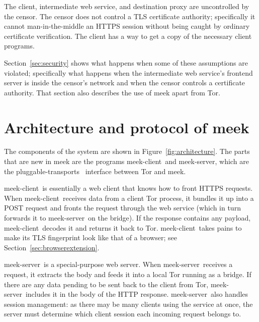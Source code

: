 \documentclass[conference]{IEEEtran}
\def\meekclient{\mbox{meek-client}}
\def\meekserver{\mbox{meek-server}}
\begin{document}
The client,
intermediate web service,
and destination proxy
are uncontrolled by the censor.
The censor does not control a TLS certificate authority;
specifically it cannot man-in-the-middle an HTTPS session
without being caught by ordinary certificate verification.
The client has a way to get a copy of the necessary client programs.

Section~\ref{sec:security} shows what happens when some
of these assumptions are violated;
specifically what happens
when the intermediate web service's frontend server is inside the censor's network
and when the censor controls a certificate authority.
That section also describes the use of meek apart from Tor.


\section{Architecture and protocol of meek}
\label{sec:architecture}

The components of the system are shown in Figure~\ref{fig:architecture}.
The parts that are new in meek
are the programs \meekclient\ and \meekserver,
which are the pluggable-transports~\cite{pt} interface between Tor and meek.

\meekclient\ is essentially a web client that knows how to front HTTPS requests.
When \meekclient\ receives data from a client Tor process, it bundles it up into a POST request
and fronts the request through the web service
(which in turn forwards it to \meekserver\ on the bridge).
If the response contains any payload, \meekclient\ decodes it and returns it back to Tor.
\meekclient\ takes pains to make its TLS fingerprint
look like that of a browser; see Section~\ref{sec:browserextension}.

\meekserver\ is a special-purpose web server.
When \meekserver\ receives a request, it extracts the body and feeds it into
a local Tor running as a bridge.
If there are any data pending to be sent back to the client from Tor,
\meekserver\ includes it in the body of the HTTP response.
\meekserver\ also handles session management:
as there may be many clients using the service at once,
the server must determine which client session each incoming request belongs to.
\end{document}
